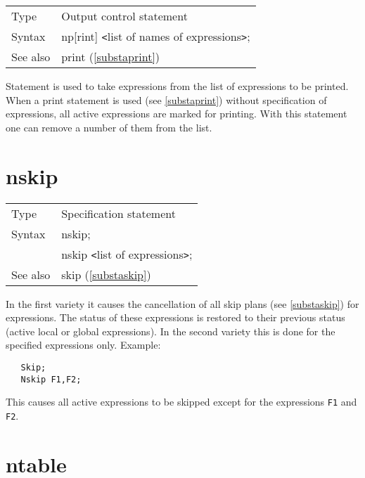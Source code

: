 \noindent \begin{tabular}{ll}
Type & Output control statement\\
Syntax & np[rint] {\tt<}list of names of expressions{\tt>};
\\ See also & print (\ref{substaprint})
\end{tabular} \vspace{4mm}

\noindent Statement is used to take expressions from the list 
of expressions to be printed. When a print statement is used 
(see \ref{substaprint}) without specification of expressions, all active 
expressions are marked for printing. With this statement one can remove a 
number of them from the list. \vspace{10mm}


\section{nskip}
\label{substanskip}

\noindent \begin{tabular}{ll}
Type & Specification statement\\
Syntax & nskip; \\
       & nskip {\tt<}list of expressions{\tt>};
\\ See also & skip (\ref{substaskip})
\end{tabular} \vspace{4mm}

\noindent In the first variety it causes the cancellation of 
all skip plans (see \ref{substaskip}) for expressions. The 
status of these expressions is restored to their previous status (active 
local or global expressions). In the second variety this is done for the 
specified expressions only. Example:
\begin{verbatim}
   Skip;
   Nskip F1,F2;
\end{verbatim}
This causes all active expressions to be skipped except for the expressions 
\verb:F1: and \verb:F2:. \vspace{10mm}


\section{ntable}
\label{substantable}

